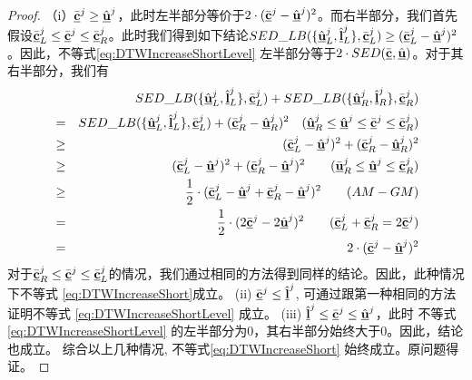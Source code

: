 \begin{proof}
	（i）$\bar{\vc}^{j} \ge \hat{\vu}^{j}$，此时左半部分等价于$2 \cdot (\bar{\vc}^{j} - \hat{\vu}^{j})^2$。而右半部分，我们首先假设$\bar{\vc}_{L}^{j} \le \bar{\vc}^{j} \le \bar{\vc}_{R}^{j}$。此时我们得到如下结论$SED\_LB(\{ \hat{\vu}_{L}^{j}, \hat{\vl}_{L}^{j} \}, \bar{\vc}_{L}^{j})  \ge (\bar{\vc}_{L}^{j} - \hat{\vu}^{j})^2$。因此，不等式\ref{eq:DTWIncreaseShortLevel} 左半部分等于$2 \cdot SED(\bar{\vc} , \hat{\vu})$。对于其右半部分，我们有
	\allowdisplaybreaks
	\begin{eqnarray}
	&&SED\_LB(\{ \hat{\vu}_{L}^{j}, \hat{\vl}_{L}^{j} \}, \bar{\vc}_{L}^{j}) + SED\_LB(\{ \hat{\vu}_{R}^{j}, \hat{\vl}_{R}^{j} \}, \bar{\vc}_{R}^{j})  \nonumber \\
	&=&SED\_LB(\{ \hat{\vu}_{L}^{j}, \hat{\vl}_{L}^{j} \}, \bar{\vc}_{L}^{j}) + (\bar{\vc}_{R}^{j}- \hat{\vu}_{R}^{j})^2 \quad ( \hat{\vu}_{R}^{j} \le \hat{\vu}^{j} \le  \bar{\vc}^{j} \le  \bar{\vc}_{R}^{j}) \nonumber \\
	&\ge&(\bar{\vc}_{L}^{j} - \hat{\vu}^{j})^2 +  (\bar{\vc}_{R}^{j}- \hat{\vu}_{R}^{j})^2 \nonumber \\
	&\ge&(\bar{\vc}_{L}^{j} - \hat{\vu}^{j})^2 +  (\bar{\vc}_{R}^{j}- \hat{\vu}^{j})^2 \qquad (\bar{\vu}_{R}^{j} \le \hat{\vu}^{j} \le \bar{\vc}_{R}^{j}) \nonumber \\
	&\ge&\frac{1}{2}\cdot (\bar{\vc}_{L}^{j} - \hat{\vu}^{j}  + \bar{\vc}_{R}^{j} - \hat{\vu}^{j})^2 \nonumber \qquad (AM-GM) \\
	&=&\frac{1}{2}\cdot (2 \bar{\vc}^{j} - 2\hat{\vu}^{j})^2  \qquad (\bar{\vc}_{L}^{j} + \bar{\vc}_{R}^{j} = 2\bar{\vc}^{j}) \nonumber  \nonumber \\
	&=& 2\cdot  (\bar{\vc}^{j} - \hat{\vu}^{j})^2 
	\end{eqnarray}
	\allowdisplaybreaks[4]
对于$\bar{\vc}_{R}^{j} \le \bar{\vc}^{j} \le \bar{\vc}_{L}^{j}$的情况，我们通过相同的方法得到同样的结论。因此，此种情况下不等式 \ref{eq:DTWIncreaseShort}成立。
	(ii)  $\bar{\vc}^{j} \le \hat{\vl}^{j}$, 可通过跟第一种相同的方法证明不等式 \ref{eq:DTWIncreaseShortLevel} 成立。
	(iii)  $\hat{\vl}^{j} \le \bar{\vc}^{j} \le \hat{\vu}^{j}$，此时 不等式\ref{eq:DTWIncreaseShortLevel} 的左半部分为0，其右半部分始终大于0。因此，结论也成立。
	综合以上几种情况, 不等式\ref{eq:DTWIncreaseShort} 始终成立。原问题得证。
\end{proof}

\clearpage
\phantom{s}
\clearpage